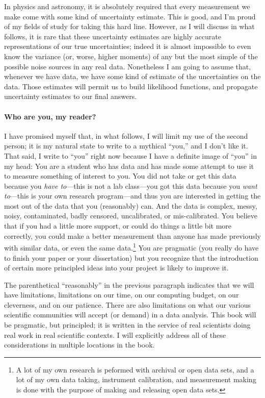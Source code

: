 In physics and astronomy, it is absolutely required that every measurement we make come with some kind of uncertainty estimate.
This is good, and I'm proud of my fields of study for taking this hard line.
However, as I will discuss in what follows, it is rare that these uncertainty estimates are highly accurate representations of our true uncertainties; indeed it is almost impossible to even know the variance (or, worse, higher moments) of any but the most simple of the possible noise sources in any real data.
Nonetheless I am going to assume that, whenever we have data, we have some kind of estimate of the uncertainties on the data.
Those estimates will permit us to build likelihood functions, and propagate uncertainty estimates to our final answers.

\paragraph{Who are you, my reader?}
I have promised myself that, in what follows, I will limit my use of the second person; it is my natural state to write to a mythical ``you,'' and I don't like it.
That said, I write to ``you'' right now because I have a definite image of ``you'' in my head:
You are a student who has data and has made some attempt to use it to measure something of interest to you.
You did not take or get this data because you \emph{have to}---this is not a lab class---you got this data because you \emph{want to}---this is your own research program---and thus you are interested in getting the most out of the data that you (reasonably) can.
And the data is complex, messy, noisy, contaminated, badly censored, uncalibrated, or mis-calibrated.
You believe that if you had a little more support, or could do things a little bit more correctly, you could make a better measurement than anyone has made previously with similar data, or even the same data.\footnote{%
A lot of my own research is peformed with archival or open data sets, and a lot of my own data taking, instrument calibration, and measurement making is done with the purpose of making and releasing open data sets.}
You are pragmatic (you really do have to finish your paper or your dissertation) but you recognize that the introduction of certain more principled ideas into your project is likely to improve it.

The parenthetical ``reasonably'' in the previous paragraph indicates that we will have limitations,
limitations on our time, on our computing budget, on our cleverness, and on our patience.
There are also limitations on what our various scientific communities will accept (or demand) in a data analysis.
This book will be pragmatic, but principled; it is written in the service of real scientists doing real work in real scientific contexts.
I will explicitly address all of these considerations in multiple locations in the book.

